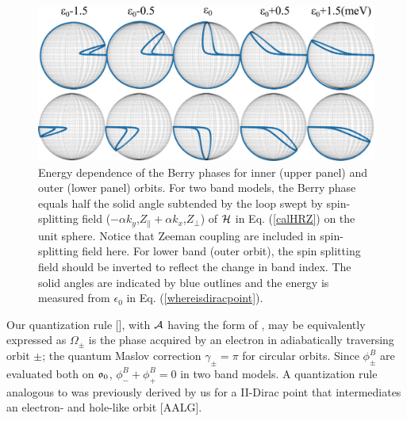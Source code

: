 \documentclass[aps, prb, showpacs, twocolumn, notitlepage, superscriptaddress]{revtex4-1}
\begin{document}

\begin{figure}
\includegraphics[width=1.0\columnwidth]{blochsphere.png}
\caption{Energy dependence of the Berry phases for inner (upper panel) and outer (lower panel) orbits. For two band models, the Berry phase equals half the solid angle subtended by the loop swept by spin-splitting field ($-\alpha k_y$,$Z_\parallel+\alpha k_x$,$Z_\perp$) of $\mathcal{H}$ in Eq. (\ref{calHRZ}) on the unit sphere. Notice that Zeeman coupling are included in spin-splitting field here. For lower band (outer orbit), the spin splitting field should be inverted to reflect the change in band index. The solid angles are indicated by blue outlines and the energy is measured from $\epsilon_0$ in Eq. (\ref{whereisdiracpoint}).\label{fig:blochsphere}}
\end{figure}

Our quantization rule [], with ${\cal A}$ having the form of , may be equivalently expressed as
$\Omega_{\pm}$ is the phase acquired by an electron in adiabatically traversing orbit $\pm$; the quantum Maslov correction $\gamma_{\pm}{=}\pi$ for circular orbits. Since $\phi^B_\pm$ are evaluated both on $\mathfrak{o}_0$, $\phi^B_-+\phi^B_+=0$ in two band models. A quantization rule analogous to  was previously derived by us for a II-Dirac point that intermediates an electron- and hole-like orbit [AALG]. 
\end{document}
